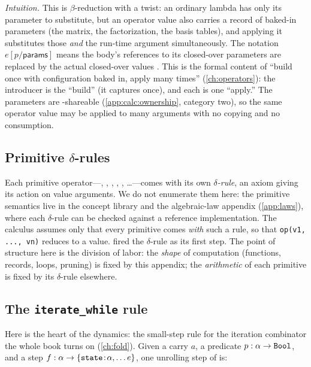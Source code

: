\noindent \emph{Intuition.} This is $\beta$-reduction with a twist: an ordinary
lambda has only its parameter to substitute, but an operator value also carries a
record of baked-in parameters (the matrix, the factorization, the basis tables),
and applying it substitutes those \emph{and} the run-time argument
simultaneously. The notation $e[p/\textsf{params}]$ means the body's references to
its closed-over parameters are replaced by the actual closed-over values .
This is the formal content of ``build once with configuration baked in, apply many
times'' (\cref{ch:operators}): the  introducer is the
``build'' (it captures  once), and each  is one ``apply.''
The parameters  are \code{!}-shareable
(\cref{app:calc:ownership}, category two), so the same operator value may be
applied to many arguments with no copying and no consumption.

\subsection{Primitive \texorpdfstring{$\delta$}{delta}-rules}
\label{app:calc:delta}

Each primitive operator---, , , ,
, \dots---comes with its own \emph{$\delta$-rule}, an axiom giving
its action on value arguments. We do not enumerate them here: the primitive
semantics live in the concept library and the algebraic-law appendix
(\cref{app:laws}), where each $\delta$-rule can be checked against a reference
implementation. The calculus assumes only that every primitive  comes
\emph{with} such a rule, so that \lstinline[style=l4style]|op(v1, ..., vn)|
reduces to a value.  fired the  $\delta$-rule
as its first step. The point of structure here is the division of labor: the
\emph{shape} of computation (functions, records, loops, pruning) is fixed by this
appendix; the \emph{arithmetic} of each primitive is fixed by its $\delta$-rule
elsewhere.

\subsection{The \texttt{iterate\_while} rule}
\label{app:calc:iterate}

Here is the heart of the dynamics: the small-step rule for the iteration
combinator the whole book turns on (\cref{ch:fold}). Given a carry $a$, a
predicate $p : \alpha \to \texttt{Bool}$, and a step
$f : \alpha \to \{\texttt{state}\!:\!\alpha, \dots e\}$, one unrolling step of
 is:

